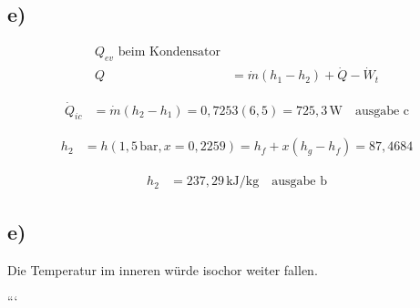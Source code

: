 \subsection*{e)}
\begin{align*}
    Q_{ev} \text{ beim Kondensator} \\
    Q &= \dot{m} (h_1 - h_2) + \dot{Q} - \dot{W}_t
\end{align*}

\begin{align*}
    \dot{Q}_{ic} &= \dot{m} (h_2 - h_1) = 0,7253 (6,5) = 725,3 \, \text{W} \quad \text{ausgabe c}
\end{align*}

\begin{align*}
    h_2 &= h(1,5 \, \text{bar}, x = 0,2259) = h_f + x (h_g - h_f) = 87,4684
\end{align*}

\begin{align*}
    h_2 &= 237,29 \, \text{kJ/kg} \quad \text{ausgabe b}
\end{align*}

\subsection*{e)}
Die Temperatur im inneren würde isochor weiter fallen.

```